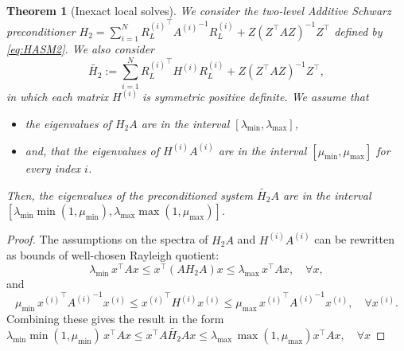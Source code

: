 \documentclass[10pt,a4paper]{amsart}
\newtheorem{theorem}{Theorem}
\newcommand{\Htwo}{H_2}
\newcommand{\Htwoap}{\widetilde{\Htwo}}
\begin{document}
\begin{theorem}[Inexact local solves]
We consider the two-level Additive Schwarz preconditioner 
$\Htwo = \sum_{i=1}^N {R_L^{(i)}}^\top {A^{(i)}}^{-1} R_L^{(i)} + Z (Z^\top A Z)^{-1} Z^\top$ defined by \eqref{eq:HASM2}. 
We also consider 
\begin{equation}
\Htwoap := \sum_{i=1}^N {R_L^{(i)}}^\top H^{(i)} R_L^{(i)} + Z (Z^\top A Z)^{-1} Z^\top,
\end{equation}
in which each matrix $H^{(i)}$ is symmetric positive definite. We assume that 

\begin{itemize}
\item the eigenvalues of $\Htwo A$ are in the interval $[\lambda_{\min},\lambda_{\max}]$, 
\item and, that the eigenvalues of $H^{(i)} A^{(i)}$ are in the interval $[\mu_{\min}, \mu_{\max}]$ for every index $i$. 
\end{itemize}
Then, the eigenvalues of the preconditioned system $\Htwoap A$ are in the interval \\ $[\lambda_{\min} \min (1, \mu_{\min}), \lambda_{\max} \max (1, \mu_{\max})]$.
\label{th:th_kappa_DD_BPX}
\end{theorem}

\begin{proof}
The assumptions on the spectra of  $\Htwo A$ and  $H^{(i)} A^{(i)}$ can be rewritten as bounds of well-chosen Rayleigh quotient: 
\[
\lambda_{\min}\, x^\top A x \leq  x^\top (A \Htwo A) x \leq  \lambda_{\max}\, x^\top  A x, \quad \forall x, 
\]
and 
\[
\mu_{\min}\, {x^{(i)} }^\top  {A^{(i)}}^{-1} x^{(i)} \leq    {x^{(i) }}^\top  {H^{(i)}}  x^{(i)}  \leq  \mu_{\max}\, {x^{(i) }}^\top  {A^{(i)}}^{-1} x^{(i)},  \quad \forall x^{(i)}. 
\]
Combining these gives the result in the form\\ $\lambda_{\min} \min (1, \mu_{\min})\, x^\top A x \leq  x^\top A \Htwoap A x \leq    \lambda_{\max}\, \max (1, \mu_{\max})x^\top  A x, \quad \forall x $ 

\end{proof}
\end{document}
